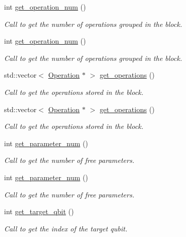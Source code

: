 \begin{DoxyCompactItemize}
int \hyperlink{class_operation__block_a27592a2d25c7e74416de2b9d7997efca}{get\+\_\+operation\+\_\+num} ()
\begin{DoxyCompactList}\small\item\em Call to get the number of operations grouped in the block. \end{DoxyCompactList}\item 
int \hyperlink{class_operation__block_a27592a2d25c7e74416de2b9d7997efca}{get\+\_\+operation\+\_\+num} ()
\begin{DoxyCompactList}\small\item\em Call to get the number of operations grouped in the block. \end{DoxyCompactList}\item 
std\+::vector$<$ \hyperlink{class_operation}{Operation} $\ast$ $>$ \hyperlink{class_operation__block_aecb9b674dfd43456605a6c13dfba3afb}{get\+\_\+operations} ()
\begin{DoxyCompactList}\small\item\em Call to get the operations stored in the block. \end{DoxyCompactList}\item 
std\+::vector$<$ \hyperlink{class_operation}{Operation} $\ast$ $>$ \hyperlink{class_operation__block_a489d0c5758732ca49d5f5aca225e9318}{get\+\_\+operations} ()
\begin{DoxyCompactList}\small\item\em Call to get the operations stored in the block. \end{DoxyCompactList}\item 
int \hyperlink{class_operation__block_af7ff4a8876a7b1c062ea2f35efac18b0}{get\+\_\+parameter\+\_\+num} ()
\begin{DoxyCompactList}\small\item\em Call to get the number of free parameters. \end{DoxyCompactList}\item 
int \hyperlink{class_operation__block_af7ff4a8876a7b1c062ea2f35efac18b0}{get\+\_\+parameter\+\_\+num} ()
\begin{DoxyCompactList}\small\item\em Call to get the number of free parameters. \end{DoxyCompactList}\item 
int \hyperlink{class_operation_a55eee2ad4b90be085b1ec2ce018502f8}{get\+\_\+target\+\_\+qbit} ()
\begin{DoxyCompactList}\small\item\em Call to get the index of the target qubit. \end{DoxyCompactList}\item 

\end{DoxyCompactItemize}
